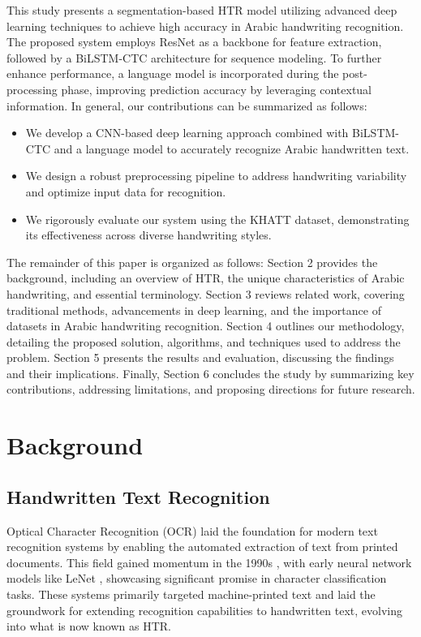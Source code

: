\documentclass[conference]{IEEEtran}
\begin{document}
This study presents a segmentation-based HTR model utilizing advanced deep learning techniques to achieve high accuracy in Arabic handwriting recognition. The proposed system employs ResNet as a backbone for feature extraction, followed by a BiLSTM-CTC architecture for sequence modeling. To further enhance performance, a language model is incorporated during the post-processing phase, improving prediction accuracy by leveraging contextual information. In general, our contributions can be summarized as follows:

\begin{itemize}
    \item We develop a CNN-based deep learning approach combined with BiLSTM-CTC and a language model to accurately recognize Arabic handwritten text.
    \item We design a robust preprocessing pipeline to address handwriting variability and optimize input data for recognition.
    \item We rigorously evaluate our system using the KHATT dataset, demonstrating its effectiveness across diverse handwriting styles.
\end{itemize}

The remainder of this paper is organized as follows: Section 2 provides the background, including an overview of HTR, the unique characteristics of Arabic handwriting, and essential terminology. Section 3 reviews related work, covering traditional methods, advancements in deep learning, and the importance of datasets in Arabic handwriting recognition. Section 4 outlines our methodology, detailing the proposed solution, algorithms, and techniques used to address the problem. Section 5 presents the results and evaluation, discussing the findings and their implications. Finally, Section 6 concludes the study by summarizing key contributions, addressing limitations, and proposing directions for future research.


\section{Background}

\subsection{Handwritten Text Recognition}

Optical Character Recognition (OCR) laid the foundation for modern text recognition systems by enabling the automated extraction of text from printed documents. This field gained momentum in the 1990s \cite{parvez2013offline}, with early neural network models like LeNet \cite{lecun1998gradient}, showcasing significant promise in character classification tasks. These systems primarily targeted machine-printed text and laid the groundwork for extending recognition capabilities to handwritten text, evolving into what is now known as HTR.
\end{document}
